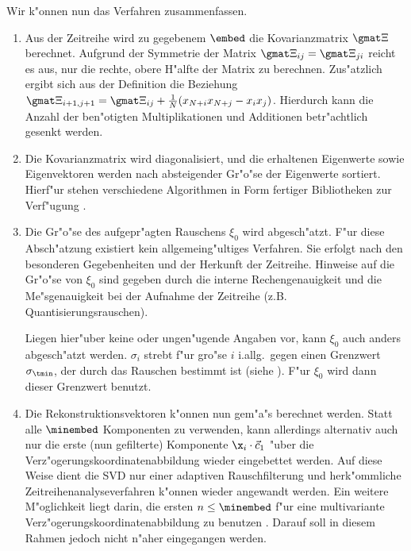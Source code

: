 Wir k"onnen nun das Verfahren zusammenfassen.
\begin{enumerate}
\item Aus der Zeitreihe wird zu gegebenem $\embed$ die Kovarianzmatrix $\gmat \Xi$
  berechnet.  Aufgrund der Symmetrie der Matrix $\gmat \Xi_{ij}=\gmat \Xi_{ji}$ reicht es
  aus, nur die rechte, obere H"alfte der Matrix zu berechnen. Zus"atzlich ergibt sich aus
  der Definition  die Beziehung
  $\gmat\Xi_{i+1,j+1}=\gmat\Xi_{ij}+\frac{1}{N}(x_{N+i}x_{N+j}-x_ix_j)$. Hierdurch kann
  die Anzahl der ben"otigten Multiplikationen und Additionen betr"achtlich gesenkt werden.
\item Die Kovarianzmatrix wird diagonalisiert, und die erhaltenen Eigenwerte sowie
  Eigenvektoren werden nach absteigender Gr"o"se der Eigenwerte sortiert.  Hierf"ur stehen
  verschiedene Algorithmen in Form fertiger Bibliotheken zur Verf"ugung
  \cite{Numerical-recipes}.
\item Die Gr"o"se des aufgepr"agten Rauschens $\xi_0$ wird abgesch"atzt.  F"ur diese
  Absch"atzung existiert kein allgemeing"ultiges Verfahren.  Sie erfolgt nach den
  besonderen Gegebenheiten und der Herkunft der Zeitreihe.  Hinweise auf die Gr"o"se von
  $\xi_0$ sind gegeben durch die interne Rechengenauigkeit und die Me"sgenauigkeit bei der
  Aufnahme der Zeitreihe (z.B. Quantisierungsrauschen).
  
  Liegen hier"uber keine oder ungen"ugende Angaben vor, kann $\xi_0$ auch anders
  abgesch"atzt werden.  $\sigma_i$ strebt f"ur gro"se $i$ i.allg.\ gegen einen Grenzwert
  $\sigma_\tmin$, der durch das Rauschen bestimmt ist (siehe ). F"ur
  $\xi_0$ wird dann dieser Grenzwert benutzt.
\item Die Rekonstruktionsvektoren k"onnen nun gem"a"s  berechnet werden.
  Statt alle $\minembed$ Komponenten zu verwenden, kann allerdings alternativ auch nur die
  erste (nun gefilterte) Komponente $\x_i\cdot\vec c_1$ "uber die
  Verz"ogerungskoordinatenabbildung wieder eingebettet werden.  Auf diese Weise dient die
  SVD nur einer adaptiven Rauschfilterung und herk"ommliche Zeitreihenanalyseverfahren
  k"onnen wieder angewandt werden.  Ein weitere M"oglichkeit liegt darin, die ersten
  $n\leq\minembed$ f"ur eine multivariante Verz"ogerungskoordinatenabbildung zu benutzen
  \cite{Fraedrich-wang}.  Darauf soll in diesem Rahmen jedoch nicht n"aher eingegangen
  werden.
\end{enumerate}

